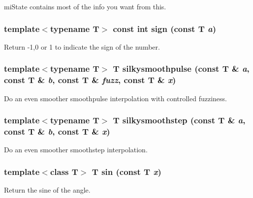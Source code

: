mi\-State contains most of the info you want from this. 

\subsubsection{\setlength{\rightskip}{0pt plus 5cm}template$<$typename T$>$ const int sign (const T {\em a})\hspace{0.3cm}{\tt  [inline]}}\label{namespacersl_a2}


Return -1,0 or 1 to indicate the sign of the number. 

\subsubsection{\setlength{\rightskip}{0pt plus 5cm}template$<$typename T$>$ T silkysmoothpulse (const T \& {\em a}, const T \& {\em b}, const T \& {\em fuzz}, const T \& {\em x})\hspace{0.3cm}{\tt  [inline]}}\label{namespacersl_a17}


Do an even smoother smoothpulse interpolation with controlled fuzziness. 

\subsubsection{\setlength{\rightskip}{0pt plus 5cm}template$<$typename T$>$ T silkysmoothstep (const T \& {\em a}, const T \& {\em b}, const T \& {\em x})\hspace{0.3cm}{\tt  [inline]}}\label{namespacersl_a13}


Do an even smoother smoothstep interpolation. 

\subsubsection{\setlength{\rightskip}{0pt plus 5cm}template$<$class T$>$ T sin (const T {\em x})\hspace{0.3cm}{\tt  [inline]}}\label{namespacersl_a30}


Return the sine of the angle. 

